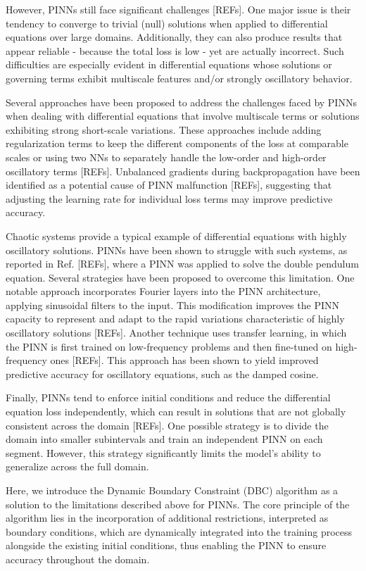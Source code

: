 However, PINNs still face significant challenges [REFs]. One major issue is their tendency to converge to trivial (null) solutions when applied to differential equations over large domains. Additionally, they can also produce results that appear reliable - because the total loss is low - yet are actually incorrect. Such difficulties are especially evident in differential equations whose solutions or governing terms exhibit multiscale features and/or strongly oscillatory behavior.

Several approaches have been proposed to address the challenges faced by PINNs when dealing with differential equations that involve multiscale terms or solutions exhibiting strong short-scale variations. These approaches include adding regularization terms to keep the different components of the loss at comparable scales or using two NNs to separately handle the low-order and high-order oscillatory terms [REFs]. Unbalanced gradients during backpropagation have been identified as a potential cause of PINN malfunction [REFs], suggesting that adjusting the learning rate for individual loss terms may improve predictive accuracy.

Chaotic systems provide a typical example of differential equations with highly oscillatory solutions. PINNs have been shown to struggle with such systems, as reported in Ref. [REFs], where a PINN was applied to solve the double pendulum equation. Several strategies have been proposed to overcome this limitation. One notable approach incorporates Fourier layers into the PINN architecture, applying sinusoidal filters to the input. This modification improves the PINN capacity to represent and adapt to the rapid variations characteristic of highly oscillatory solutions [REFs]. Another technique uses transfer learning, in which the PINN is first trained on low-frequency problems and then fine-tuned on high-frequency ones [REFs]. This approach has been shown to yield improved predictive accuracy for oscillatory equations, such as the damped cosine.

Finally, PINNs tend to enforce initial conditions and reduce the differential equation loss independently, which can result in solutions that are not globally consistent across the domain [REFs]. One possible strategy is to divide the domain into smaller subintervals and train an independent PINN on each segment. However, this strategy significantly limits the model's ability to generalize across the full domain.

Here, we introduce the Dynamic Boundary Constraint (DBC) algorithm as a solution to the limitations described above for PINNs. The core principle of the algorithm lies in the incorporation of additional restrictions, interpreted as boundary conditions, which are dynamically integrated into the training process alongside the existing initial conditions, thus enabling the PINN to ensure accuracy throughout the domain.

